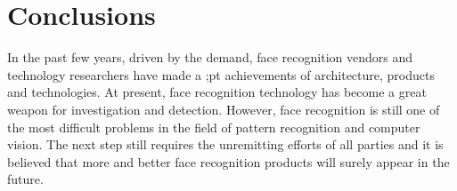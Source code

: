 \documentclass[sigconf]{acmart}
\begin{document}
\section{Conclusions}
In the past few years, driven by the demand, face recognition vendors and technology researchers have made a ;pt achievements of architecture, products and technologies. At present, face recognition technology has become a great weapon for investigation and detection. However, face recognition is still one of the most difficult problems in the field of pattern recognition and computer vision. The next step still requires the unremitting efforts of all parties and it is believed that more and better face recognition products will surely appear in the future.




 
\end{document}
